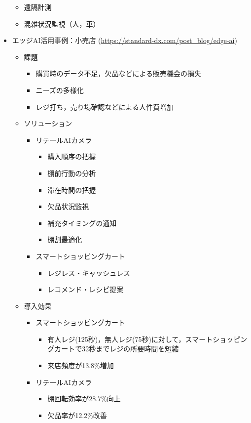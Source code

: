 \begin{itemize}
\begin{itemize}
		\item 遠隔計測
		\item 混雑状況監視（人，車）
	\end{itemize}
	\item エッジAI活用事例：小売店 (\url{https://standard-dx.com/post_blog/edge-ai})
	\begin{itemize}
		\item 課題
		\begin{itemize}
			\item 購買時のデータ不足，欠品などによる販売機会の損失
			\item ニーズの多様化
			\item レジ打ち，売り場確認などによる人件費増加
		\end{itemize}
		\item ソリューション
		\begin{itemize}
			\item リテールAIカメラ
			\begin{itemize}
				\item 購入順序の把握
				\item 棚前行動の分析
				\item 滞在時間の把握
				\item 欠品状況監視
				\item 補充タイミングの通知
				\item 棚割最適化
			\end{itemize}
			\item スマートショッピングカート
			\begin{itemize}
				\item レジレス・キャッシュレス
				\item レコメンド・レシピ提案
			\end{itemize}
		\end{itemize}
		\item 導入効果
		\begin{itemize}
			\item スマートショッピングカート
			\begin{itemize}
				\item 有人レジ(125秒)，無人レジ(75秒)に対して，スマートショッピングカートで32秒までレジの所要時間を短縮
				\item 来店頻度が13.8\%増加
			\end{itemize}
			\item リテールAIカメラ
			\begin{itemize}
				\item 棚回転効率が28.7\%向上
				\item 欠品率が12.2\%改善

\end{itemize}
\end{itemize}
\end{itemize}
\end{itemize}
